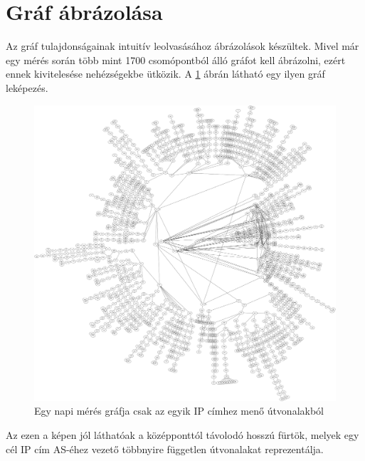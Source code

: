 \section{Gráf ábrázolása}

Az gráf tulajdonságainak intuitív leolvasásához ábrázolások készültek. Mivel már egy mérés során több mint 1700 csomópontból álló gráfot kell ábrázolni, ezért ennek kivitelesése nehézségekbe ütközik. A \ref{fig:graph} ábrán látható egy ilyen gráf leképezés.

\begin{figure}[!ht]
	\centering
	\includegraphics[width=1\textwidth, keepaspectratio]{figures/graph.png}
	\caption{Egy napi mérés gráfja csak az egyik IP címhez menő útvonalakból\label{fig:graph}}
\end{figure}

Az ezen a képen jól láthatóak a középponttól távolodó hosszú fürtök, melyek egy cél IP cím AS-éhez vezető többnyire független útvonalakat reprezentálja.


